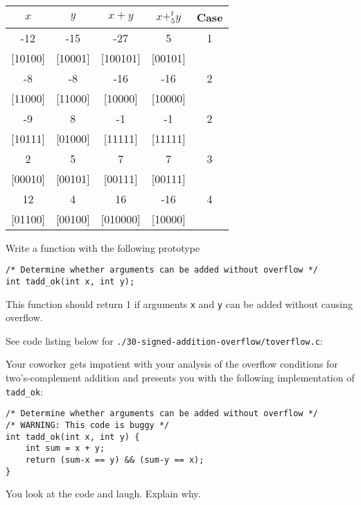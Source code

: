 \documentclass[12pt]{article}
\newenvironment{ex}[2][Exercise]{\begin{trivlist}
		\item[\hskip \labelsep {\bfseries #1}\hskip \labelsep {\bfseries #2.}]}{\end{trivlist}}
\newenvironment{sol}[1][Solution]{\begin{trivlist}
		\item[\hskip \labelsep {\bfseries #1:}]}{\end{trivlist}}
\begin{document}
\begin{sol}
	\
	\begin{center}
		\begin{tabular}{ccccc}
			$x$ & $y$ & $x+y$ & $x+^t_5y$ & Case\\
			\hline
			-12 & -15 & -27 & 5 & 1\\
			
			[10100] & [10001] & [100101] & [00101] \\
			
			-8 & -8 & -16 & -16 & 2\\
			
			[11000] & [11000] & [10000] & [10000] \\
			
			-9 & 8 & -1 & -1 & 2\\
			
			[10111] & [01000] & [11111] & [11111] \\
			
			2 & 5 & 7 & 7 & 3 \\
			
			[00010] & [00101] & [00111] & [00111] \\
			
			12 & 4 & 16 & -16 & 4\\
			
			[01100] & [00100] & [010000] & [10000]
		\end{tabular}
	\end{center}
\end{sol}

\begin{ex}{2.30}
	Write a function with the following prototype
	\begin{lstlisting}
/* Determine whether arguments can be added without overflow */
int tadd_ok(int x, int y);
	\end{lstlisting}
	This function should return 1 if arguments \texttt{x} and \texttt{y} can be added without
	causing overflow.
\end{ex}

\begin{sol}
	See code listing below for \texttt{./30-signed-addition-overflow/toverflow.c}:
	
\end{sol}

\begin{ex}{2.31}
	Your coworker gets impatient with your analysis of the overflow conditions for
	two's-complement addition and presents you with the following implementation
	of \texttt{tadd\_ok}:
	\begin{lstlisting}
/* Determine whether arguments can be added without overflow */
/* WARNING: This code is buggy */
int tadd_ok(int x, int y) {
	int sum = x + y;
	return (sum-x == y) && (sum-y == x);
}
	\end{lstlisting}
	You look at the code and laugh. Explain why.
\end{ex}
\end{document}
